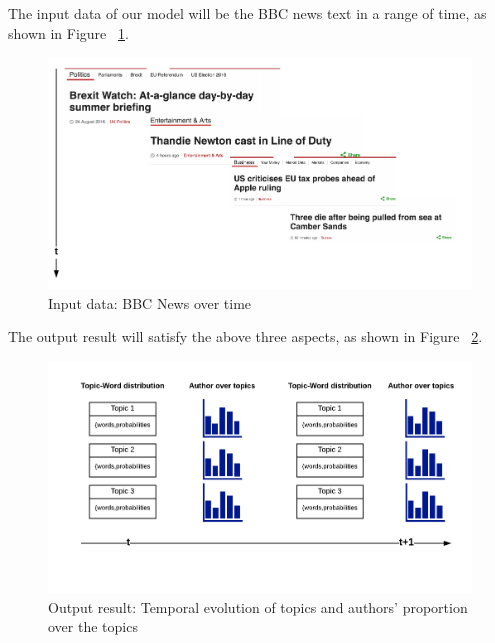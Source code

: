 The input data of our model will be the BBC news text in a range of time, as shown in Figure ~\ref{fig:input}.

\begin{figure}[h]
\centering
\includegraphics[width=\textwidth]{figures/input.png}
\caption{Input data: BBC News over time}
\label{fig:input}
\end{figure}
The output result will satisfy the above three aspects, as shown in Figure ~\ref{fig:output}.
\begin{figure}[h]
\centering
\includegraphics[width=\textwidth]{figures/output.png}
\caption{Output result: Temporal evolution of topics and authors’ proportion over the topics }
\label{fig:output}
\end{figure}



